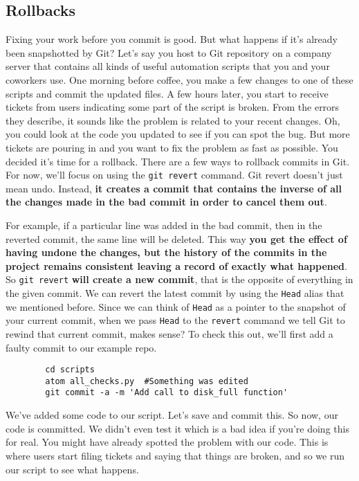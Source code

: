 	\subsection{Rollbacks}	
	
	Fixing your work before you commit is good. But what happens if it's already been snapshotted by Git? Let's say you host to Git repository on a company server that contains all kinds of useful automation scripts that you and your coworkers use. One morning before coffee, you make a few changes to one of these scripts and commit the updated files. A few hours later, you start to receive tickets from users indicating some part of the script is broken. From the errors they describe, it sounds like the problem is related to your recent changes. Oh, you could look at the code you updated to see if you can spot the bug. But more tickets are pouring in and you want to fix the problem as fast as possible. You decided it's time for a rollback. There are a few ways to rollback commits in Git. For now, we'll focus on using the \texttt{git revert} command. Git revert doesn't just mean undo. Instead, \textbf{it creates a commit that contains the inverse of all the changes made in the bad commit in order to cancel them out}.
	
	For example, if a particular line was added in the bad commit, then in the reverted commit, the same line will be deleted. This way \textbf{you get the effect of having undone the changes, but the history of the commits in the project remains consistent leaving a record of exactly what happened}. So \texttt{git revert} \textbf{will create a new commit}, that is the opposite of everything in the given commit. We can revert the latest commit by using the \texttt{Head} alias that we mentioned before. Since we can think of \texttt{Head} as a pointer to the snapshot of your current commit, when we pass \texttt{Head} to the \texttt{revert} command we tell Git to rewind that current commit, makes sense? To check this out, we'll first add a faulty commit to our example repo.

	\begin{verbatim}
		cd scripts
		atom all_checks.py  #Something was edited
		git commit -a -m 'Add call to disk_full function'		
	\end{verbatim}
	We've added some code to our script. Let's save and commit this.
	So now, our code is committed. We didn't even test it which is a bad idea if you're doing this for real. You might have already spotted the problem with our code. This is where users start filing tickets and saying that things are broken, and so we run our script to see what happens.
	
